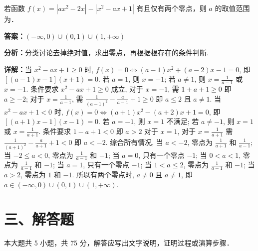 \begin{question}[points=5]
若函数 $f(x) = |ax^2 - 2x| - |x^2 - ax + 1|$ 有且仅有两个零点，则 $a$ 的取值范围为．
\begin{solution}
\textbf{答案：}$(-\infty, 0) \cup (0, 1) \cup (1, +\infty)$

\textbf{分析：}分类讨论去掉绝对值，求出零点，再根据根存在的条件判断.

\textbf{详解：}当 $x^2 - ax + 1 \ge 0$ 时, $f(x)=0 \Leftrightarrow (a-1)x^2 + (a-2)x - 1 = 0$, 即 $[(a-1)x - 1](x+1)=0$. 若 $a=1$, 则 $x=-1$; 若 $a\neq1$, 则 $x = \frac{1}{a-1}$ 或 $x=-1$. 条件要求 $x^2 - ax + 1 \ge 0$ 成立, 对于 $x=-1$, 需 $1+a+1\ge0$ 即 $a\ge -2$; 对于 $x = \frac{1}{a-1}$, 需 $\frac{1}{(a-1)^2} - \frac{a}{a-1}+1 \ge 0$ 即 $a \le 2$ 且 $a\neq1$. 当 $x^2 - ax + 1 < 0$ 时, $f(x)=0 \Leftrightarrow (a+1)x^2 - (a+2)x + 1 = 0$, 即 $[(a+1)x - 1](x-1)=0$. 若 $a=-1$, 则 $x=1$ 不满足; 若 $a\neq -1$, 则 $x=1$ 或 $x = \frac{1}{a+1}$. 条件要求 $1 - a + 1 < 0$ 即 $a>2$ 对于 $x=1$, 对于 $x = \frac{1}{a+1}$ 需 $\frac{1}{(a+1)^2} - \frac{a}{a+1} + 1 < 0$ 即 $a<-2$. 综合所有情况, 当 $a<-2$, 零点为 $\frac{1}{a+1}$ 和 $\frac{1}{a-1}$; 当 $-2\le a<0$, 零点为 $\frac{1}{a-1}$ 和 $-1$; 当 $a=0$, 只有一个零点 $-1$; 当 $0<a<1$, 零点为 $\frac{1}{a-1}$ 和 $-1$; 当 $a=1$, 只有一个零点 $-1$; 当 $1<a\le2$, 零点为 $\frac{1}{a-1}$ 和 $-1$; 当 $a>2$, 零点为 $1$ 和 $-1$. 所以有两个零点时, $a\neq0$ 且 $a\neq1$, 即 $a \in (-\infty,0) \cup (0,1) \cup (1,+\infty)$.
\end{solution}
\end{question}

\section*{三、解答题}
本大题共 5 小题，共 75 分，解答应写出文字说明，证明过程或演算步骤．

